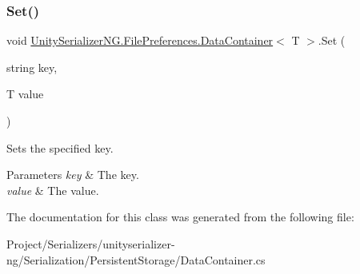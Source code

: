 \subsubsection{\texorpdfstring{Set()}{Set()}}
{\footnotesize\ttfamily void \hyperlink{class_unity_serializer_n_g_1_1_file_preferences_1_1_data_container}{Unity\+Serializer\+N\+G.\+File\+Preferences.\+Data\+Container}$<$ T $>$.Set (\begin{DoxyParamCaption}\item[{string}]{key,  }\item[{T}]{value }\end{DoxyParamCaption})\hspace{0.3cm}{\ttfamily [inline]}}



Sets the specified key. 


\begin{DoxyParams}{Parameters}
{\em key} & The key.\\
\hline
{\em value} & The value.\\
\hline
\end{DoxyParams}


The documentation for this class was generated from the following file\+:\begin{DoxyCompactItemize}
\item 
Project/\+Serializers/unityserializer-\/ng/\+Serialization/\+Persistent\+Storage/Data\+Container.\+cs\end{DoxyCompactItemize}
